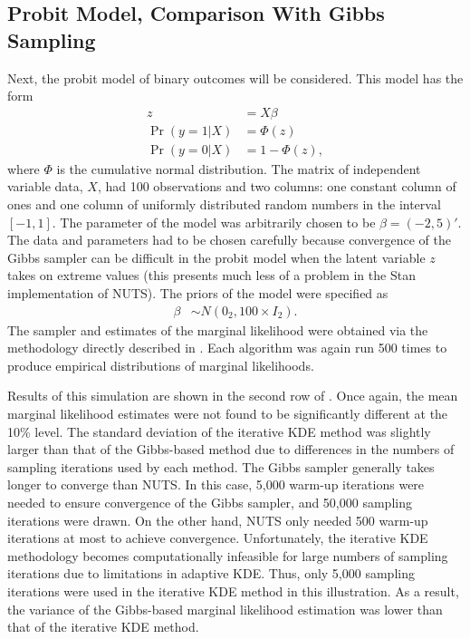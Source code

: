 \documentclass[twocolumn]{article}
\begin{document}
\subsection{Probit Model, Comparison With Gibbs Sampling}
\label{sec:ProbitGibbs}

Next, the probit model of binary outcomes will be considered. This model has the form
\begin{subequations}
\begin{align}
	z &= X\beta \\
	\Pr(y=1|X) &= \Phi(z) \\
	\Pr(y=0|X) &= 1 - \Phi(z),
\end{align}
\end{subequations}
where $\Phi$ is the cumulative normal distribution. The matrix of independent variable data, $X$, had 100 observations and two columns: one constant column of ones and one column of uniformly distributed random numbers in the interval $[-1, 1]$. The parameter of the model was arbitrarily chosen to be $\beta = (-2, 5)'$. The data and parameters had to be chosen carefully because convergence of the Gibbs sampler can be difficult in the probit model when the latent variable $z$ takes on extreme values (this presents much less of a problem in the Stan implementation of NUTS). The priors of the model were specified as
\begin{align}
	\beta &\sim N(0_2, 100 \times I_2).
\end{align}
The sampler and estimates of the marginal likelihood were obtained via the methodology directly described in \cite{Chib}. Each algorithm was again run 500 times to produce empirical distributions of marginal likelihoods.



Results of this simulation are shown in the second row of . Once again, the mean marginal likelihood estimates were not found to be significantly different at the 10\% level. The standard deviation of the iterative KDE method was slightly larger than that of the Gibbs-based method due to differences in the numbers of sampling iterations used by each method. The Gibbs sampler generally takes longer to converge than NUTS. In this case, 5,000 warm-up iterations were needed to ensure convergence of the Gibbs sampler, and 50,000 sampling iterations were drawn. On the other hand, NUTS only needed 500 warm-up iterations at most to achieve convergence. Unfortunately, the iterative KDE methodology becomes computationally infeasible for large numbers of sampling iterations due to limitations in adaptive KDE. Thus, only 5,000 sampling iterations were used in the iterative KDE method in this illustration. As a result, the variance of the Gibbs-based marginal likelihood estimation was lower than that of the iterative KDE method.
\end{document}
